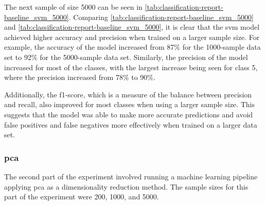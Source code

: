 The next sample of size 5000 can be seen in \ref{tab:classification-report-baseline_svm_5000}.
Comparing \ref{tab:classification-report-baseline_svm_5000} and \ref{tab:classification-report-baseline_svm_5000}, it is clear that the \gls{svm} model achieved higher accuracy and precision when trained on a larger sample size. For example, the accuracy of the model increased from 87\% for the 1000-sample data set to 92\% for the 5000-sample data set. Similarly, the precision of the model increased for most of the classes, with the largest increase being seen for class 5, where the precision increased from 78\% to 90\%.

Additionally, the f1-score, which is a measure of the balance between precision and recall, also improved for most classes when using a larger sample size. This suggests that the model was able to make more accurate predictions and avoid false positives and false negatives more effectively when trained on a larger data set.


\subsubsection{\gls{pca}}\label{subsubsec:experiment_4_pca}

The second part of the experiment involved running a machine learning pipeline applying \gls{pca} as a dimensionality reduction method. The sample sizes for this part of the experiment were 200, 1000, and 5000.

